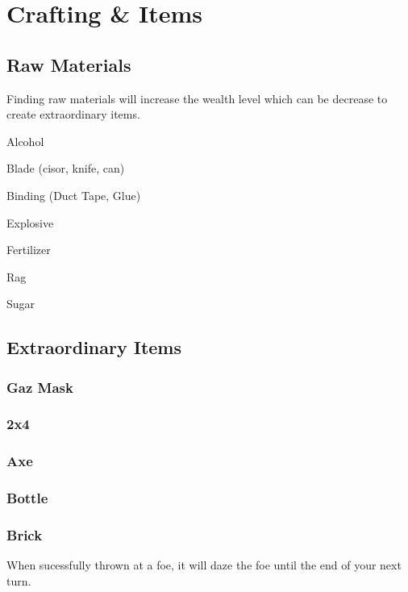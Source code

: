 \documentclass[10pt,twoside,twocolumn]{book}
\begin{document}
%
%
\mainmatter
\chapter{Crafting \& Items}

\section{Raw Materials}

Finding raw materials will increase the wealth level which can be decrease to create extraordinary items. 

\begin{rpg-list}
  \item Alcohol
  \item Blade (cisor, knife, can)
  \item Binding (Duct Tape, Glue)
  \item Explosive
  \item Fertilizer
  \item Rag
  \item Sugar
\end{rpg-list}

\section{Extraordinary Items}

\subsection{Gaz Mask}

\subsection{2x4}

\subsection{Axe}

\subsection{Bottle}

\subsection{Brick}

When sucessfully thrown at a foe, it will daze the foe until the end of your next turn.
\end{document}
